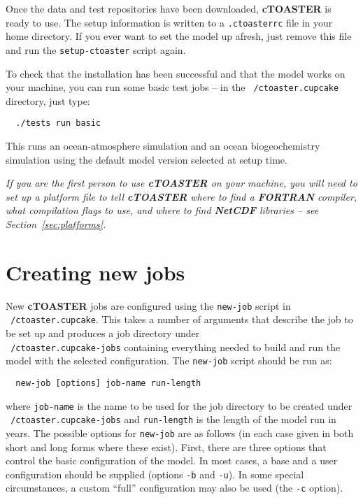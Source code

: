 \documentclass[a4paper,10pt,article]{memoir}
\begin{document}
Once the data and test repositories have been downloaded, \textbf{cTOASTER} is ready to use.  The setup information is written to a \texttt{.ctoasterrc} file in your home directory. If you ever want to set the model up afresh, just remove this file and run the \texttt{setup-ctoaster} script again.

To check that the installation has been successful and that the model works on your machine, you can run some basic test jobs -- in the \texttt{~/ctoaster.cupcake} directory, just type:
\begin{verbatim}
  ./tests run basic
\end{verbatim}
This runs an ocean-atmosphere simulation and an ocean biogeochemistry simulation using the default model version selected at setup time.

\emph{If you are the first person to use \textbf{cTOASTER} on your machine, you
  will need to set up a platform file to tell \textbf{cTOASTER} where to find a
  \textbf{FORTRAN} compiler, what compilation flags to use, and where to find
  \textbf{NetCDF} libraries -- see Section~\ref{sec:platforms}.}

\section{Creating new jobs}

New \textbf{cTOASTER} jobs are configured using the \texttt{new-job} script in
\texttt{~/ctoaster.cupcake}. This takes a number of arguments that describe the
job to be set up and produces a job directory under
\\\texttt{~/ctoaster.cupcake-jobs} containing everything needed to build and run
the model with the selected configuration.  The \texttt{new-job}
script should be run as:
\begin{verbatim}
  new-job [options] job-name run-length
\end{verbatim}
where \texttt{job-name} is the name to be used for the job directory
to be created under \texttt{~/ctoaster.cupcake-jobs} and \texttt{run-length} is
the length of the model run in years.  The possible options for
\texttt{new-job} are as follows (in each case given in both short and
long forms where these exist).  First, there are three options that
control the basic configuration of the model.  In most cases, a base
and a user configuration should be supplied (options \texttt{-b} and
\texttt{-u}).  In some special circumstances, a custom ``full''
configuration may also be used (the \texttt{-c} option).
\end{document}
